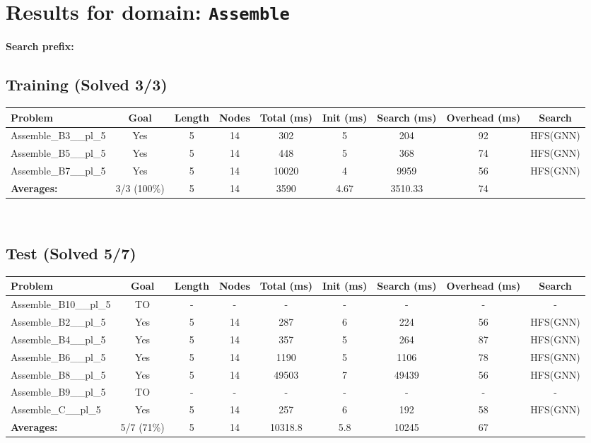 \documentclass{article}
\begin{document}
\section*{Results for domain: \texttt{Assemble}}
\textbf{Search prefix:} 
\\[0.5cm]
\subsection*{Training (Solved 3/3)}
\begin{tabular}{lcccccccc}
\toprule
Problem & Goal & Length & Nodes & Total (ms) & Init (ms) & Search (ms) & Overhead (ms) & Search \\
\midrule
Assemble\_B3\_\_pl\_5 & Yes & 5 & 14 & 302 & 5 & 204 & 92 & HFS(GNN) \\
Assemble\_B5\_\_pl\_5 & Yes & 5 & 14 & 448 & 5 & 368 & 74 & HFS(GNN) \\
Assemble\_B7\_\_pl\_5 & Yes & 5 & 14 & 10020 & 4 & 9959 & 56 & HFS(GNN) \\
\textbf{Averages:} & 3/3 (100\%) & 5 & 14 & 3590 & 4.67 & 3510.33 & 74 & \\
\bottomrule
\end{tabular}
\\[0.7cm]
\subsection*{Test (Solved 5/7)}
\begin{tabular}{lcccccccc}
\toprule
Problem & Goal & Length & Nodes & Total (ms) & Init (ms) & Search (ms) & Overhead (ms) & Search \\
\midrule
Assemble\_B10\_\_pl\_5 & TO & - & - & - & - & - & - & - \\
Assemble\_B2\_\_pl\_5 & Yes & 5 & 14 & 287 & 6 & 224 & 56 & HFS(GNN) \\
Assemble\_B4\_\_pl\_5 & Yes & 5 & 14 & 357 & 5 & 264 & 87 & HFS(GNN) \\
Assemble\_B6\_\_pl\_5 & Yes & 5 & 14 & 1190 & 5 & 1106 & 78 & HFS(GNN) \\
Assemble\_B8\_\_pl\_5 & Yes & 5 & 14 & 49503 & 7 & 49439 & 56 & HFS(GNN) \\
Assemble\_B9\_\_pl\_5 & TO & - & - & - & - & - & - & - \\
Assemble\_C\_\_pl\_5 & Yes & 5 & 14 & 257 & 6 & 192 & 58 & HFS(GNN) \\
\textbf{Averages:} & 5/7 (71\%) & 5 & 14 & 10318.8 & 5.8 & 10245 & 67 & \\
\bottomrule
\end{tabular}
\\[0.7cm]
\end{document}
